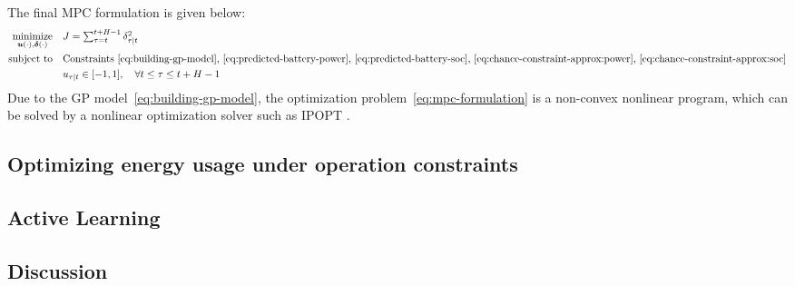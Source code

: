 The final MPC formulation  is given below:
\begin{align}
\label{eq:mpc-formulation}
\minimize_{\boldsymbol{u}(\cdot), \boldsymbol{\delta}(\cdot)} \quad & J = \textstyle\sum_{\tau = t}^{t+H-1} \predict{\tau}{\delta^2} \\
\text{subject to} \quad & \text{Constraints \eqref{eq:building-gp-model}, \eqref{eq:predicted-battery-power}, \eqref{eq:predicted-battery-soc}, \eqref{eq:chance-constraint-approx:power}, \eqref{eq:chance-constraint-approx:soc}} \nonumber \\
& \predict{\tau}{u} \in [-1, 1], \quad \forall t \leq \tau \leq t+H-1 \nonumber
\end{align}
Due to the GP model~\eqref{eq:building-gp-model}, the optimization problem~\eqref{eq:mpc-formulation} is a non-convex nonlinear program, which can be solved by a nonlinear optimization solver such as IPOPT \cite{wachter2006implementation}.


\subsection{Optimizing energy usage under operation constraints}
\begin{figure}[!tb]
	\centering
	\missingfigure[figwidth=20pc]{}
	\caption{}
	\captionsetup{justification=centering}
	\label{F:MPC2}
\end{figure}

\subsection{Active Learning}

\subsection{Discussion}


